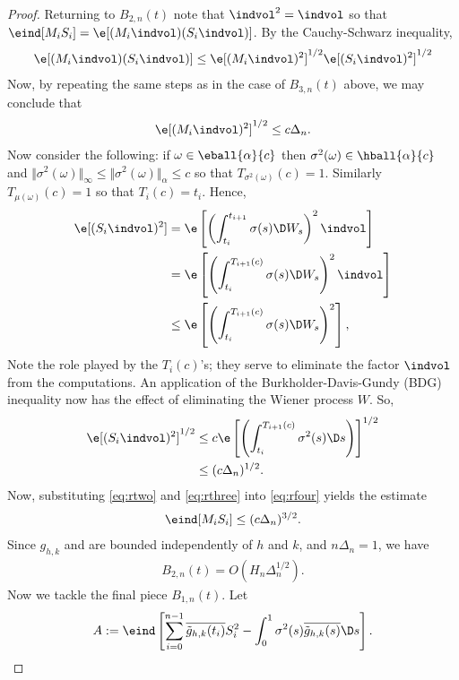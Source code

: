 \begin{appendices}
\begin{proof}
Returning to $B_{2,n}(t)$ note that $\indvol^2 = \indvol$ so that
$\eind[M_iS_i] = \e[(M_i \indvol) (S_i \indvol)]$. By the Cauchy-Schwarz inequality, 
\begin{align}
  \e[(M_i \indvol) (S_i \indvol)]\le \e[(M_i \indvol)^2]^{1/2}\e[ (S_i \indvol)^2]^{1/2}\label{eq:rfour}
\end{align}
Now, by repeating the same steps as in the case of  $B_{3,n}(t)$ above, we  may conclude that 
\begin{align} 
  \e[(M_i \indvol)^2]^{1/2} \le  c \Delta_n \label{eq:rtwo}.
\end{align}
Now consider the following: if $\omega \in \eball{\alpha}{c}$ then $\sigma^2(\omega) \in \hball{\alpha}{c}$ and $\Vert \sigma^2(\omega) \Vert_\infty \le \Vert \sigma^2(\omega)\Vert_\alpha \le c$ so  that $T_{\sigma^2(\omega)}(c) = 1$. Similarly $T_{\mu(\omega)}(c) = 1$ so that $T_i(c) = t_i$.  Hence, 
\begin{align}
  \e[ (S_i \indvol)^2] &= \e\left[\left(\int_{t_i}^{t_{i+1}} \sigma(s) \D W_s\right)^2\indvol\right]\notag\\
&= \e\left[\left(\int_{t_i}^{T_{i+1}(c)} \sigma(s) \D W_s\right)^2\indvol\right]\notag\\
&\le \e\left[\left(\int_{t_i}^{T_{i+1}(c)} \sigma(s) \D W_s\right)^2\right],
\end{align}
Note the role played by the $T_i(c)$'s; they serve to eliminate the factor $\indvol$ from the computations.  An application of the Burkholder-Davis-Gundy (BDG) inequality now has the effect of eliminating the Wiener process $W$. So,
\begin{align}
  \notag\e[ (S_i \indvol)^2]^{1/2} &\le c\e\left[\left(\int_{t_i}^{T_{i+1}(c)} \sigma^2(s) \D s\right)\right]^{1/2}\notag \\
  &\le (c \Delta_n)^{1/2}.\label{eq:rthree}
\end{align}
 Now, substituting \eqref{eq:rtwo} and \eqref{eq:rthree} into \eqref{eq:rfour} yields the estimate
\begin{align}
  \eind[M_i S_i] \le (c\Delta_n)^{3/2}.\label{eq:ms}
\end{align}
Since  $g_{h,k}$ and \tghk  are bounded independently of $h$ and $k$, and $n\Delta_n = 1$, we have
\begin{align}
  B_{2,n}(t) = O( H_n \Delta_n^{1/2}).
  \label{}
\end{align}
Now we tackle the final piece $B_{1,n}(t)$. Let 
\begin{align}
  A  := \eind\left[\sum_{i=0}^{n-1}\btghki S_i^2 -\int_{0}^{1} \sigma^2(s) \btghks \D s\right].

\end{align}
\end{proof}
\end{appendices}
